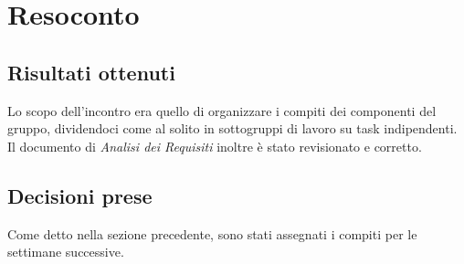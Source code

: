 \section{Resoconto}

\subsection{Risultati ottenuti}
Lo scopo dell'incontro era quello di organizzare i compiti dei componenti del gruppo, dividendoci come al solito in sottogruppi di lavoro su task indipendenti. Il documento di \textit{Analisi dei Requisiti} inoltre è stato revisionato e corretto.

\subsection{Decisioni prese}
Come detto nella sezione precedente, sono stati assegnati i compiti per le settimane successive.